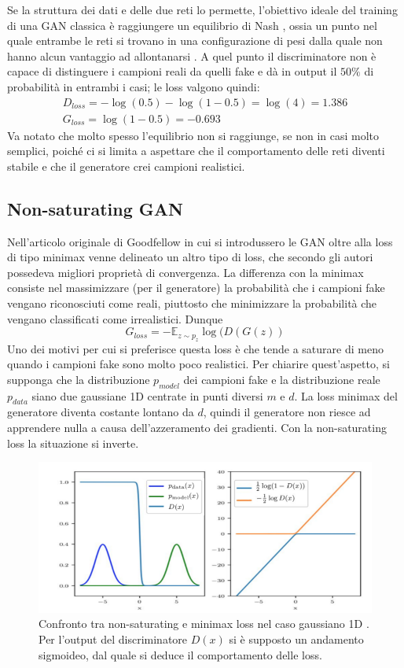 \documentclass[a4paper]{article}
\begin{document}
Se la struttura dei dati e delle due reti lo permette, l'obiettivo ideale del training di una GAN classica è raggiungere un equilibrio di Nash
\cite{Nash48}, ossia un punto nel quale entrambe le reti si trovano in una configurazione di pesi dalla quale non hanno alcun vantaggio ad allontanarsi  \cite{manypathsgan}. A quel punto il discriminatore non è capace di distinguere i campioni reali da quelli fake e dà in output il $50\%$ di probabilità in entrambi i casi; le loss valgono quindi:
\begin{align}
D_{loss} = - \log(0.5) - \log(1 - 0.5) = \log(4) = 1.386\\
G_{loss} = \log(1- 0.5) = - 0.693 
\end{align}
Va notato che molto spesso l'equilibrio non si raggiunge, se non in casi molto semplici, poiché ci si limita a aspettare che il comportamento delle reti diventi stabile e che il generatore crei campioni realistici.
\subsection{Non-saturating GAN}
\label{Non-saturating GAN}
Nell'articolo originale di Goodfellow\cite{goodfellowgan} in cui si introdussero le GAN oltre alla loss di tipo minimax venne delineato un altro tipo di loss, che secondo gli autori possedeva migliori proprietà di convergenza.
La differenza con la minimax consiste nel massimizzare (per il generatore) la probabilità che i campioni fake vengano riconosciuti come reali, piuttosto che minimizzare la probabilità che vengano classificati come irrealistici. Dunque 
\begin{equation}
G_{loss} = - \mathbb{E}_{z \sim p_z} \log(D(G(z))
\end{equation}
Uno dei motivi per cui si preferisce questa loss è che tende a saturare di meno quando i campioni fake sono molto poco realistici. Per chiarire quest'aspetto, si supponga che la distribuzione $p_{model}$ dei campioni fake e la distribuzione reale $p_{data}$ siano due gaussiane 1D centrate in punti diversi $m$ e $d$. La loss minimax del generatore diventa costante lontano da $d$, quindi il generatore non riesce ad apprendere nulla a causa dell'azzeramento dei gradienti. Con la non-saturating loss la situazione si inverte.
\begin{figure}[H]
\includegraphics[scale=0.5]{non-saturating-GAN.png}
\centering
\caption{Confronto tra non-saturating e minimax loss nel caso gaussiano 1D \cite{manypathsgan}. Per l'output del discriminatore $D(x)$ si è supposto un andamento sigmoideo, dal quale si deduce il comportamento delle loss.}
\end{figure}
\end{document}
